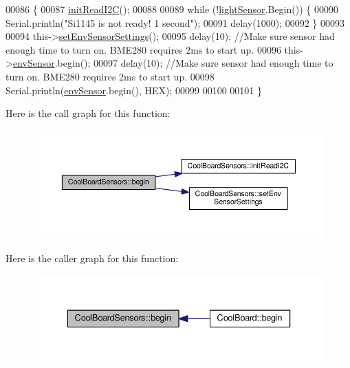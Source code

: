 \begin{DoxyCode}
00086 \{       
00087     \hyperlink{class_cool_board_sensors_acad6a8418c66d36868caca23c844ecb6}{initReadI2C}();
00088 
00089     \textcolor{keywordflow}{while} (!\hyperlink{class_cool_board_sensors_a3e397300fb707dd193e909a757bf6102}{lightSensor}.Begin()) \{
00090       Serial.println(\textcolor{stringliteral}{"Si1145 is not ready!  1 second"});
00091       delay(1000);
00092     \}
00093      
00094     this->\hyperlink{class_cool_board_sensors_a406307ffd70272282d91479c7ed8d66f}{setEnvSensorSettings}();
00095     delay(10);  \textcolor{comment}{//Make sure sensor had enough time to turn on. BME280 requires 2ms to start up.}
00096     this->\hyperlink{class_cool_board_sensors_a868e38985e9a2412829fa2790ca13e2e}{envSensor}.begin();
00097     delay(10);  \textcolor{comment}{//Make sure sensor had enough time to turn on. BME280 requires 2ms to start up.}
00098     Serial.println(\hyperlink{class_cool_board_sensors_a868e38985e9a2412829fa2790ca13e2e}{envSensor}.begin(), HEX);
00099 
00100 
00101 \}
\end{DoxyCode}
Here is the call graph for this function\+:\nopagebreak
\begin{figure}[H]
\begin{center}
\leavevmode
\includegraphics[width=350pt]{class_cool_board_sensors_a97095823ef7c8f5290812f1405b966b3_cgraph}
\end{center}
\end{figure}
Here is the caller graph for this function\+:\nopagebreak
\begin{figure}[H]
\begin{center}
\leavevmode
\includegraphics[width=336pt]{class_cool_board_sensors_a97095823ef7c8f5290812f1405b966b3_icgraph}
\end{center}
\end{figure}
\mbox{\label{class_cool_board_sensors_a9a218895c5423375c33c08f2c56fb23a}} 
